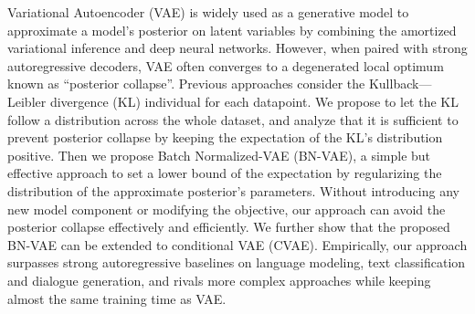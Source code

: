 Variational Autoencoder (VAE) is widely used as a generative model to approximate a model's posterior on latent variables by combining the amortized variational inference and deep neural networks. However, when paired with strong autoregressive decoders, VAE often converges to a degenerated local optimum known as ``posterior collapse''. Previous approaches consider the Kullback---Leibler divergence (KL) individual for each datapoint. We propose to let the KL follow a distribution across the whole dataset, and analyze that it is sufficient to prevent posterior collapse by keeping the expectation of the KL's distribution positive. Then we propose Batch Normalized-VAE (BN-VAE), a simple but effective approach to set a lower bound of the expectation by regularizing the distribution of the approximate posterior's parameters. Without introducing any new model component or modifying the objective, our approach can avoid the posterior collapse effectively and efficiently. We further show that the proposed BN-VAE can be extended to conditional VAE (CVAE). Empirically, our approach surpasses strong autoregressive baselines on language modeling, text classification and dialogue generation, and rivals more complex approaches while keeping almost the same training time as VAE.
